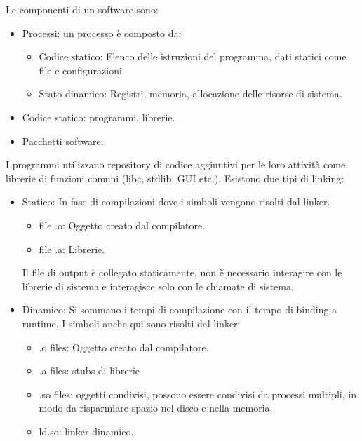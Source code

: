 \documentclass{article}
\begin{document}
		Le componenti di un software sono:
		\begin{itemize}
		    \item Processi: un processo è composto da:
		    \begin{itemize}
		        \item Codice statico: Elenco delle istruzioni del programma, dati statici come file e configurazioni
		        \item Stato dinamico: Registri, memoria, allocazione delle risorse di sistema.
		    \end{itemize}
		    \item Codice statico: programmi, librerie.
		    \item Pacchetti software.
		\end{itemize}
		I programmi utilizzano repository di codice aggiuntivi per le loro attività come librerie di funzioni comuni (libc, stdlib, GUI etc.).
		Esistono due tipi di linking:
		\begin{itemize}
		    \item Statico: In fase di compilazioni dove i simboli vengono risolti dal linker. 
		    \begin{itemize}
		        \item file .o: Oggetto creato dal compilatore.
		        \item file .a: Librerie.
		    \end{itemize}
		    Il file di output è collegato staticamente, non è necessario interagire con le librerie di sistema e interagisce solo con le chiamate di sistema.
		    \item Dinamico: Si sommano i tempi di compilazione con il tempo di binding a runtime.
		    I simboli anche qui sono risolti dal linker:
		    \begin{itemize}
		        \item .o files: Oggetto creato dal compilatore.
		        \item .a files: stubs di librerie
		        \item .so files: oggetti condivisi, possono essere condivisi da processi multipli, in modo da risparmiare spazio nel disco e nella memoria.
		        \item ld.so: linker dinamico.
		    \end{itemize}
		\end{itemize}
\end{document}
